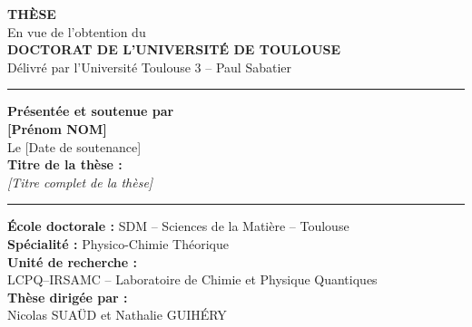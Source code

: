 \documentclass[a4paper,12pt]{article}
\newcommand{\ligneRouge}{
  \vspace{3mm}
  \noindent\textcolor{red!70!black}{\rule{0.75\textwidth}{0.8pt}}
  \vspace{3mm}
}
\begin{document}
\vspace*{-1cm}
\noindent
\hfill
\vspace{1cm}

\begin{center}
  {\fontsize{36}{42}\selectfont\textbf{\textcolor{red!70!black}{THÈSE}}}\\[1.2cm]

  {\large En vue de l’obtention du}\\[2mm]
  {\Large\textbf{DOCTORAT DE L’UNIVERSITÉ DE TOULOUSE}}\\[3mm]
  {\normalsize Délivré par l’Université Toulouse 3 – Paul Sabatier}
\end{center}

\vspace{1cm}

\begin{center}
  \ligneRouge
  \textbf{Présentée et soutenue par}\\[2mm]
  {\Large\textbf{[Prénom NOM]}}\\[2mm] %
  Le [Date de soutenance]\\[4mm]
  \textbf{Titre de la thèse :}\\[2mm]
  \textit{[Titre complet de la thèse]} %
  \ligneRouge
\end{center}

\vspace{3mm}

\begin{center}
  \textbf{École doctorale :} SDM – Sciences de la Matière – Toulouse\\[2mm]
  \textbf{Spécialité :} Physico-Chimie Théorique\\[2mm]
  \textbf{Unité de recherche :}\\
  LCPQ–IRSAMC – Laboratoire de Chimie et Physique Quantiques\\[2mm]
  \textbf{Thèse dirigée par :}\\
  Nicolas SUAÜD et Nathalie GUIHÉRY
\end{center}

\vspace{0.6cm}
\end{document}
